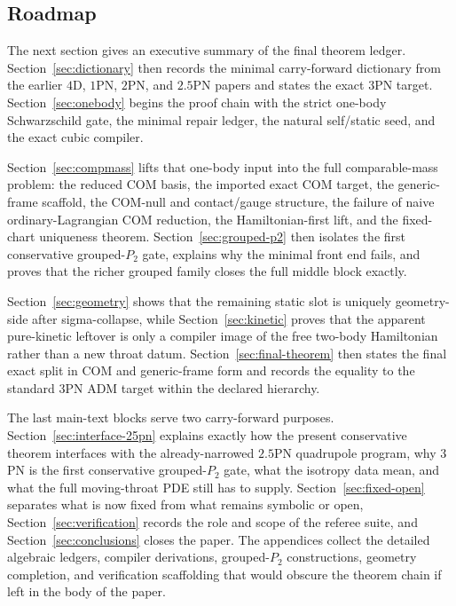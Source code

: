 \documentclass[11pt]{article}
\begin{document}
\subsection{Roadmap}
\label{sec:intro-roadmap}

The next section gives an executive summary of the final theorem ledger.
Section~\ref{sec:dictionary} then records the minimal carry-forward dictionary
from the earlier $4$D, $1$PN, $2$PN, and $2.5$PN papers and states the exact
$3$PN target.  Section~\ref{sec:onebody} begins the proof chain with the strict
one-body Schwarzschild gate, the minimal repair ledger, the natural self/static
seed, and the exact cubic compiler.

Section~\ref{sec:compmass} lifts that one-body input into the full
comparable-mass problem: the reduced COM basis, the imported exact COM target,
the generic-frame scaffold, the COM-null and contact/gauge structure, the
failure of naive ordinary-Lagrangian COM reduction, the Hamiltonian-first lift,
and the fixed-chart uniqueness theorem.  Section~\ref{sec:grouped-p2} then
isolates the first conservative grouped-$P_2$ gate, explains why the minimal
front end fails, and proves that the richer grouped family closes the full
middle block exactly.

Section~\ref{sec:geometry} shows that the remaining static slot is uniquely
geometry-side after sigma-collapse, while Section~\ref{sec:kinetic} proves that
the apparent pure-kinetic leftover is only a compiler image of the free two-body
Hamiltonian rather than a new throat datum.  Section~\ref{sec:final-theorem}
then states the final exact split in COM and generic-frame form and records the
equality to the standard $3$PN ADM target within the declared hierarchy.

The last main-text blocks serve two carry-forward purposes.  Section~\ref{sec:interface-25pn}
explains exactly how the present conservative theorem interfaces with the
already-narrowed $2.5$PN quadrupole program, why $3$PN is the first
conservative grouped-$P_2$ gate, what the isotropy data mean, and what the full
moving-throat PDE still has to supply.  Section~\ref{sec:fixed-open} separates
what is now fixed from what remains symbolic or open, Section~\ref{sec:verification}
records the role and scope of the referee suite, and Section~\ref{sec:conclusions}
closes the paper.  The appendices collect the detailed algebraic ledgers,
compiler derivations, grouped-$P_2$ constructions, geometry completion, and
verification scaffolding that would obscure the theorem chain if left in the
body of the paper.
\end{document}
